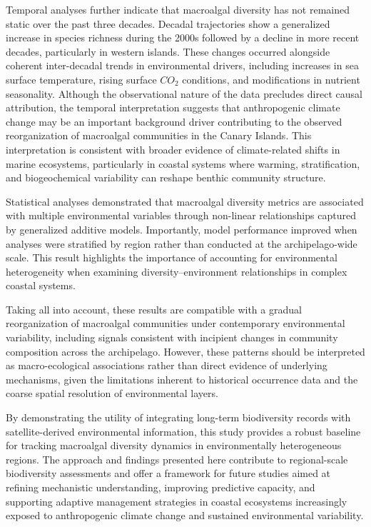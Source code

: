 \documentclass[a4paper,fleqn]{cas-sc}
\begin{document}
Temporal analyses further indicate that macroalgal diversity has not remained static over the past three decades. Decadal trajectories show a generalized increase in species richness during the 2000s followed by a decline in more recent decades, particularly in western islands. These changes occurred alongside coherent inter-decadal trends in environmental drivers, including increases in sea surface temperature, rising surface $CO_{2}$ conditions, and modifications in nutrient seasonality. Although the observational nature of the data precludes direct causal attribution, the temporal interpretation suggests that anthropogenic climate change may be an important background driver contributing to the observed reorganization of macroalgal communities in the Canary Islands. This interpretation is consistent with broader evidence of climate-related shifts in marine ecosystems, particularly in coastal systems where warming, stratification, and biogeochemical variability can reshape benthic community structure.

Statistical analyses demonstrated that macroalgal diversity metrics are associated with multiple environmental variables through non-linear relationships captured by generalized additive models. Importantly, model performance improved when analyses were stratified by region rather than conducted at the archipelago-wide scale. This result highlights the importance of accounting for environmental heterogeneity when examining diversity–environment relationships in complex coastal systems.

Taking all into account, these results are compatible with a gradual reorganization of macroalgal communities under contemporary environmental variability, including signals consistent with incipient changes in community composition across the archipelago. However, these patterns should be interpreted as macro-ecological associations rather than direct evidence of underlying mechanisms, given the limitations inherent to historical occurrence data and the coarse spatial resolution of environmental layers.

By demonstrating the utility of integrating long-term biodiversity records with satellite-derived environmental information, this study provides a robust baseline for tracking macroalgal diversity dynamics in environmentally heterogeneous regions. The approach and findings presented here contribute to regional-scale biodiversity assessments and offer a framework for future studies aimed at refining mechanistic understanding, improving predictive capacity, and supporting adaptive management strategies in coastal ecosystems increasingly exposed to anthropogenic climate change and sustained environmental variability.
\end{document}
